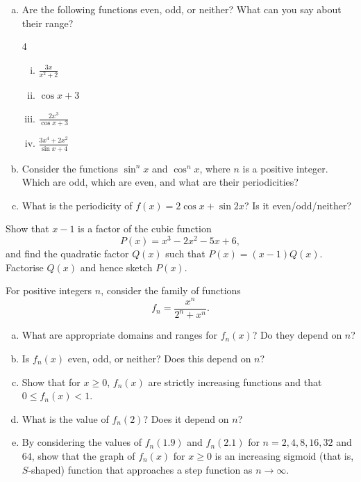 %

%
\begin{enumerate}[(a)]
\item Are the following functions even, odd, or neither? What can you say
about their range?
\begin{multicols}{4}
 \begin{enumerate}[(i)]
\item $\displaystyle \frac{3x}{x^2+2}$
\item $\displaystyle \cos x+3$
\item $\displaystyle \frac{2x^3}{\cos x+3}$
\item $\displaystyle \frac{3x^4+2x^2}{\sin x+4}$
\end{enumerate}
\end{multicols}
\item Consider the functions $\sin^n x$ and $\cos^n x$, where $n$ is a positive integer.
Which are odd, which are even, and what are their periodicities?
\item What is the periodicity of $f(x) = 2 \cos x+\sin 2x$? Is it even/odd/neither?

\end{enumerate}

Show that $x-1$ is a factor of the cubic function%
$$P(x)=x^3-2x^2-5x+6,$$
and  find the quadratic factor $Q(x)$ such that $P(x) = (x -1)Q(x)$. Factorise
$Q(x)$ and hence sketch $P(x).$

{}%
For positive integers $n$, consider the family of functions
$$\displaystyle f_n= \frac{x^n}{2^n+x^n}.$$
\begin{enumerate}[(a)]
\item What are appropriate domains and ranges for $f_n(x)$? Do they depend on $n$?

\item Is $f_n(x)$ even, odd, or neither? Does this depend on $n$?

\item Show that for $x\geq 0$, $f_n(x)$ are strictly increasing functions and that
$0\leq f_n(x) < 1.$
\item What is the value of $f_n(2)$? Does it depend on $n$?

\item By considering the values of $f_n(1.9)$ and $f_n(2.1)$ for $n = 2, 4, 8, 16, 32$ and
$64$, show that the graph of $f_n(x)$ for $x\ge 0$ is an increasing sigmoid (that
is, $S$-shaped) function that approaches a step function as $n\rightarrow \infty$.
\end{enumerate}

